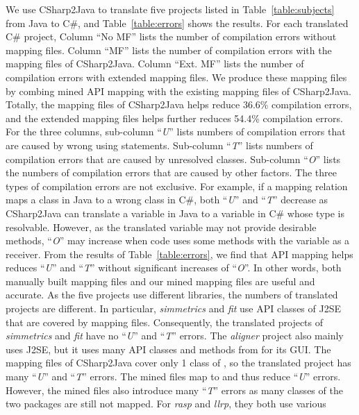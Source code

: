 We use CSharp2Java to translate five projects listed in
Table~\ref{table:subjects} from Java to C\#, and
Table~\ref{table:errors} shows the results. For each translated C\#
project, Column ``No MF'' lists the number of compilation errors
without mapping files. Column ``MF'' lists the number of compilation
errors with the mapping files of CSharp2Java. Column ``Ext. MF''
lists the number of compilation errors with extended mapping files.
We produce these mapping files by combing mined API mapping with the
existing mapping files of CSharp2Java. Totally, the mapping files of
CSharp2Java helps reduce 36.6\% compilation errors, and the extended
mapping files helps further reduces 54.4\% compilation errors. For
the three columns, sub-column ``\emph{U}'' lists numbers of
compilation errors that are caused by wrong using statements.
Sub-column ``\emph{T}'' lists numbers of compilation errors that are
caused by unresolved classes. Sub-column ``\emph{O}'' lists the
numbers of compilation errors that are caused by other factors. The
three types of compilation errors are not exclusive. For example, if
a mapping relation maps a class in Java to a wrong class in C\#,
both ``\emph{U}'' and ``\emph{T}'' decrease as CSharp2Java can
translate a variable in Java to a variable in C\# whose type is
resolvable. However, as the translated variable may not provide
desirable methods, ``\emph{O}'' may increase when code uses some
methods with the variable as a receiver. From the results of
Table~\ref{table:errors}, we find that API mapping helps reduces
``\emph{U}'' and ``\emph{T}'' without significant increases of
``\emph{O}''. In other words, both manually built mapping files and
our mined mapping files are useful and accurate. As the five
projects use different libraries, the numbers of translated projects
are different. In particular, \emph{simmetrics} and \emph{fit} use
API classes of J2SE that are covered by mapping files. Consequently,
the translated projects of \emph{simmetrics} and \emph{fit} have no
``\emph{U}'' and ``\emph{T}'' errors. The \emph{aligner} project
also mainly uses J2SE, but it uses many API classes and methods from
 for its GUI. The mapping files of CSharp2Java
cover only 1 class of , so the translated project
has many ``\emph{U}'' and ``\emph{T}'' errors. The mined files map
 to  and thus reduce
``\emph{U}'' errors. However, the mined files also introduce many
``\emph{T}'' errors as many classes of the two packages are still
not mapped. For \emph{rasp} and \emph{llrp}, they both use various
